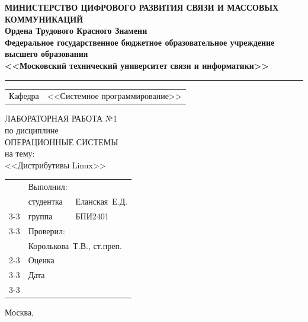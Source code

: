 \thispagestyle{empty}

\begin{center}
	\textbf{МИНИСТЕРСТВО ЦИФРОВОГО РАЗВИТИЯ СВЯЗИ И МАССОВЫХ КОММУНИКАЦИЙ} \\
	\textbf{Ордена Трудового Красного Знамени \\
		Федеральное государственное бюджетное образовательное учреждение высшего образования \\
		<<Московский технический университет связи и информатики>>}
\end{center}
\rule{\linewidth}{1pt}

\vspace{0.3em}

\begin{center}
	\begin{tabularx}{0.6\textwidth}{p{1.2cm}X}
		Кафедра & \quad <<Системное программирование>> \\%
	\end{tabularx}
\end{center}

\vspace{10em}

\begin{center}
	\Large
	ЛАБОРАТОРНАЯ РАБОТА №1 \\
	\large
	по дисциплине \\
	ОПЕРАЦИОННЫЕ СИСТЕМЫ \\
	на тему: \\
	<<Дистрибутивы Linux>>
\end{center}

\vspace{4em}

\renewcommand{\arraystretch}{1.1}
\begin{tabularx}{\textwidth}{p{10cm}p{2cm}p{3cm}}
	& Выполнил: & \\
	& студентка & Еланская~Е.Д. \\\cline{3-3} 
	& группа & БПИ2401 \\\cline{3-3} 
	& Проверил: &  \\
	& \multicolumn{2}{l}{Королькова~Т.В., ст.преп.} \\\cline{2-3}
	& Оценка & \\\cline{3-3} 
	& Дата & \\\cline{3-3} 
\end{tabularx}

\vspace{5em}

\begin{center}
	Москва,~\the\year
\end{center}
\clearpage

